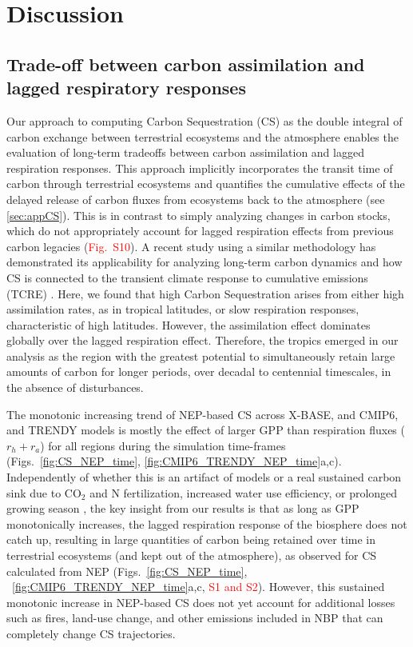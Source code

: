 \documentclass[ProofPDF]{./Styles/Jnls-Template-V3}
\begin{document}
\section{Discussion}
\subsection{Trade-off between carbon assimilation and lagged respiratory responses}
Our approach to computing Carbon Sequestration (CS) as the double integral of carbon exchange between terrestrial ecosystems and the atmosphere enables the evaluation of long-term tradeoffs between carbon assimilation and lagged respiration responses. This approach implicitly incorporates the transit time of carbon through terrestrial ecosystems and quantifies the cumulative effects of the delayed release of carbon fluxes from ecosystems back to the atmosphere (see \ref{sec:appCS}). This is in contrast to simply analyzing changes in carbon stocks, which do not appropriately account for lagged respiration effects from previous carbon legacies (\textcolor{red}{Fig.~S10}). A recent study using a similar methodology has demonstrated its applicability for analyzing long-term carbon dynamics and how CS is connected to the transient climate response to cumulative emissions (TCRE) \citep{Matthews2023}. Here, we found that high Carbon Sequestration arises from either high assimilation rates, as in tropical latitudes, or slow respiration responses, characteristic of high latitudes. However, the assimilation effect dominates globally over the lagged respiration effect. Therefore, the tropics emerged in our analysis as the region with the greatest potential to simultaneously retain large amounts of carbon for longer periods, over decadal to centennial timescales, in the absence of disturbances. 

The monotonic increasing trend of NEP-based CS across X-BASE, and CMIP6, and TRENDY models is mostly the effect of larger GPP than respiration fluxes ($r_h+r_a$) for all regions during the simulation time-frames (Figs.~\ref{fig:CS_NEP_time}, \ref{fig:CMIP6_TRENDY_NEP_time}a,c). Independently of whether this is an artifact of models or a real sustained carbon sink due to CO$_2$ and N fertilization, increased water use efficiency, or prolonged growing season \citep{Fernandez-Martinez2017,Fernandez-Martinez2019,OSullivan2019,Friedlingstein2023,Ruehr2023}, the key insight from our results is that as long as GPP monotonically increases, the lagged respiration response of the biosphere does not catch up, resulting in large quantities of carbon being retained over time in terrestrial ecosystems (and kept out of the atmosphere), as observed for CS calculated from NEP (Figs.~\ref{fig:CS_NEP_time}, ~\ref{fig:CMIP6_TRENDY_NEP_time}a,c, \textcolor{red}{S1 and S2}). However, this sustained monotonic increase in NEP-based CS does not yet account for additional losses such as fires, land-use change, and other emissions included in NBP that can completely change CS trajectories.
\end{document}
